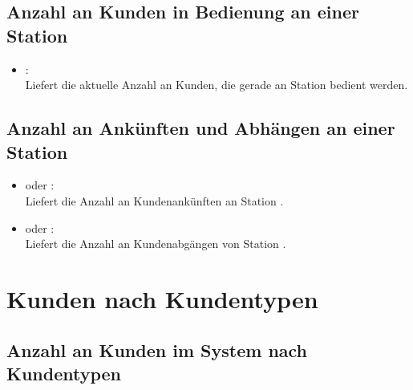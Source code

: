 


\subsection{Anzahl an Kunden in Bedienung an einer Station}

\begin{itemize}

\item
{}:\\
Liefert die aktuelle Anzahl an Kunden, die gerade an Station  bedient werden.

\end{itemize}  



\subsection{Anzahl an Ankünften und Abhängen an einer Station}

\begin{itemize}

\item
{} oder :\\
Liefert die Anzahl an Kundenankünften an Station .

\item
{} oder :\\
Liefert die Anzahl an Kundenabgängen von Station .

\end{itemize}  





\section{Kunden nach Kundentypen}



\subsection{Anzahl an Kunden im System nach Kundentypen}

